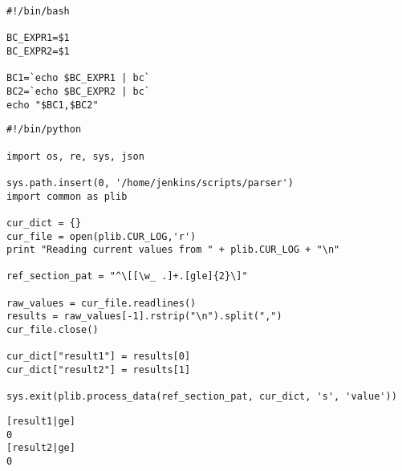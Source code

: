 \begin{lstlisting}[label=bc-device,caption=\texttt{bc-device.sh} file]
#!/bin/bash

BC_EXPR1=$1
BC_EXPR2=$1

BC1=`echo $BC_EXPR1 | bc`
BC2=`echo $BC_EXPR2 | bc`
echo "$BC1,$BC2"
\end{lstlisting}

\begin{lstlisting}[label=bc-parser,caption=\texttt{parser.py} file]
#!/bin/python

import os, re, sys, json

sys.path.insert(0, '/home/jenkins/scripts/parser') 
import common as plib

cur_dict = {}
cur_file = open(plib.CUR_LOG,'r')
print "Reading current values from " + plib.CUR_LOG + "\n"

ref_section_pat = "^\[[\w_ .]+.[gle]{2}\]"

raw_values = cur_file.readlines()
results = raw_values[-1].rstrip("\n").split(",")
cur_file.close()

cur_dict["result1"] = results[0]
cur_dict["result2"] = results[1]

sys.exit(plib.process_data(ref_section_pat, cur_dict, 's', 'value'))
\end{lstlisting}

\begin{lstlisting}[label=bc-reference,caption=\texttt{reference.log} file]
[result1|ge]
0
[result2|ge]
0
\end{lstlisting}


